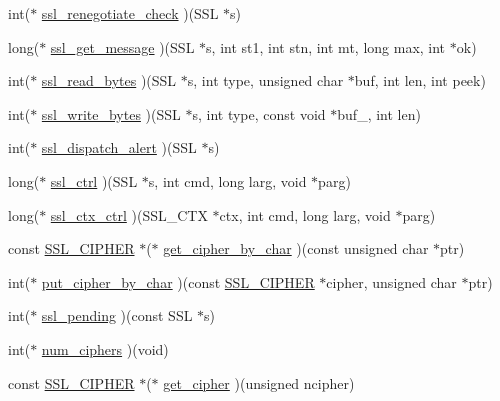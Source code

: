 \begin{DoxyCompactItemize}
\item 
int($\ast$ \hyperlink{structssl__method__st_a88a73e9ebda59498197eb0e6d971d099}{ssl\-\_\-renegotiate\-\_\-check} )(S\-S\-L $\ast$s)
\item 
long($\ast$ \hyperlink{structssl__method__st_abc7d388378f3f61658ba3cb2ff8d493f}{ssl\-\_\-get\-\_\-message} )(S\-S\-L $\ast$s, int st1, int stn, int mt, long max, int $\ast$ok)
\item 
int($\ast$ \hyperlink{structssl__method__st_a8dd5a534ea9770a3fcf2ea91ce8b30d1}{ssl\-\_\-read\-\_\-bytes} )(S\-S\-L $\ast$s, int type, unsigned char $\ast$buf, int len, int peek)
\item 
int($\ast$ \hyperlink{structssl__method__st_afe0ec27b4cecc8692e915dfe403e70a4}{ssl\-\_\-write\-\_\-bytes} )(S\-S\-L $\ast$s, int type, const void $\ast$buf\-\_\-, int len)
\item 
int($\ast$ \hyperlink{structssl__method__st_a9edf0cd5d4d18f3a0ac0250324c3cea1}{ssl\-\_\-dispatch\-\_\-alert} )(S\-S\-L $\ast$s)
\item 
long($\ast$ \hyperlink{structssl__method__st_a05895fdcc347e26857903f4e9ab1fd30}{ssl\-\_\-ctrl} )(S\-S\-L $\ast$s, int cmd, long larg, void $\ast$parg)
\item 
long($\ast$ \hyperlink{structssl__method__st_a61f10fd3d5215c108d31e750f48d9ec6}{ssl\-\_\-ctx\-\_\-ctrl} )(S\-S\-L\-\_\-\-C\-T\-X $\ast$ctx, int cmd, long larg, void $\ast$parg)
\item 
const \hyperlink{ssl_8h_a548d7a5d565a9e0e9bd45c49f8c95701}{S\-S\-L\-\_\-\-C\-I\-P\-H\-E\-R} $\ast$($\ast$ \hyperlink{structssl__method__st_a7f33bc7f66f8af52e626c154be7795f7}{get\-\_\-cipher\-\_\-by\-\_\-char} )(const unsigned char $\ast$ptr)
\item 
int($\ast$ \hyperlink{structssl__method__st_adbb1a7591225577ffe6996267c5e2a9f}{put\-\_\-cipher\-\_\-by\-\_\-char} )(const \hyperlink{ssl_8h_a548d7a5d565a9e0e9bd45c49f8c95701}{S\-S\-L\-\_\-\-C\-I\-P\-H\-E\-R} $\ast$cipher, unsigned char $\ast$ptr)
\item 
int($\ast$ \hyperlink{structssl__method__st_a94feb7703c74de9cdbe49d2b2772d97e}{ssl\-\_\-pending} )(const S\-S\-L $\ast$s)
\item 
int($\ast$ \hyperlink{structssl__method__st_ac94952d064203e9f6953b0cda68c93b7}{num\-\_\-ciphers} )(void)
\item 
const \hyperlink{ssl_8h_a548d7a5d565a9e0e9bd45c49f8c95701}{S\-S\-L\-\_\-\-C\-I\-P\-H\-E\-R} $\ast$($\ast$ \hyperlink{structssl__method__st_a4ff7b9c1ea43e3b94ad40e7ad9ff80f2}{get\-\_\-cipher} )(unsigned ncipher)

\end{DoxyCompactItemize}
